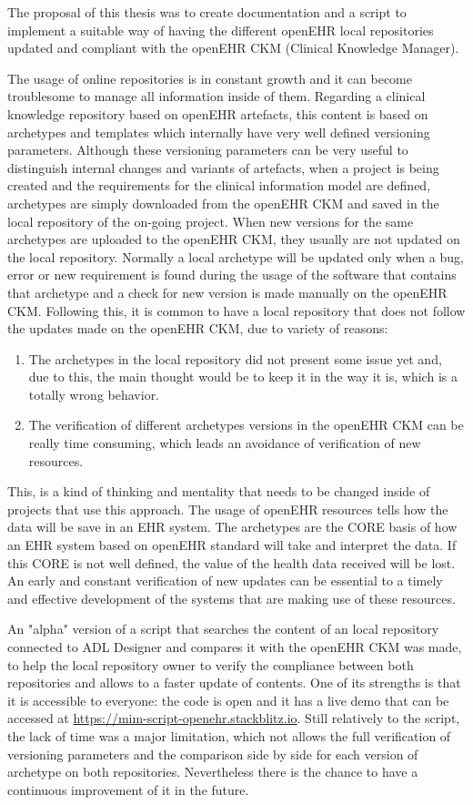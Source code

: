 \documentclass[mim_thesis.tex]{subfiles}
\begin{document}
The proposal of this thesis was to create documentation and a script to implement a suitable way of having the different openEHR local repositories updated and compliant with the openEHR CKM (Clinical Knowledge Manager).   

The usage of online repositories is in constant growth and it can become troublesome to manage all information inside of them. Regarding a clinical knowledge repository based on openEHR artefacts, this content is based on archetypes and templates which internally have very well defined versioning parameters.
Although these versioning parameters can be very useful to distinguish internal changes and variants of artefacts, when a project is being created and the requirements for the clinical information model are defined, archetypes are simply downloaded from the openEHR CKM and saved in the local repository of the on-going project. When new versions for the same archetypes are uploaded to the openEHR CKM, they usually are not updated on the local repository. Normally a local archetype will be updated only when a bug, error or new requirement is found during the usage of the software that contains that archetype and a check for new version is made manually on the openEHR CKM. Following this, it is common to have a local repository that does not follow the updates made on the openEHR CKM, due to variety of reasons: 
\begin{enumerate}[noitemsep]
\item The archetypes in the local repository did not present some issue yet and, due to this, the main thought would be to keep it in the way it is, which is a totally wrong behavior. 
\item The verification of different archetypes versions in the openEHR CKM can be really time consuming, which leads an avoidance of verification of new resources.
\end{enumerate}

This, is a kind of thinking and mentality that needs to be changed inside of projects that use this approach. The usage of openEHR resources tells how the data will be save in an EHR system. The archetypes are the CORE basis of how an EHR system based on openEHR standard will take and interpret the data. If this CORE is not well defined, the value of the health data received will be lost. An early and constant verification of new updates can be essential to a timely and effective development of the systems that are making use of these resources.

An "alpha" version of a script that searches the content of an local repository connected to ADL Designer and compares it with the openEHR CKM was made, to help the local repository owner to verify the compliance between both repositories and allows to a faster update of contents. One of its strengths is that it is accessible to everyone: the code is open and it has a live demo that can be accessed at \url{https://mim-script-openehr.stackblitz.io}. Still relatively to the script, the lack of time was a major limitation, which not allows the full verification of versioning parameters and the comparison side by side for each version of archetype on both repositories. Nevertheless there is the chance to have a continuous improvement of it in the future. 
\end{document}
